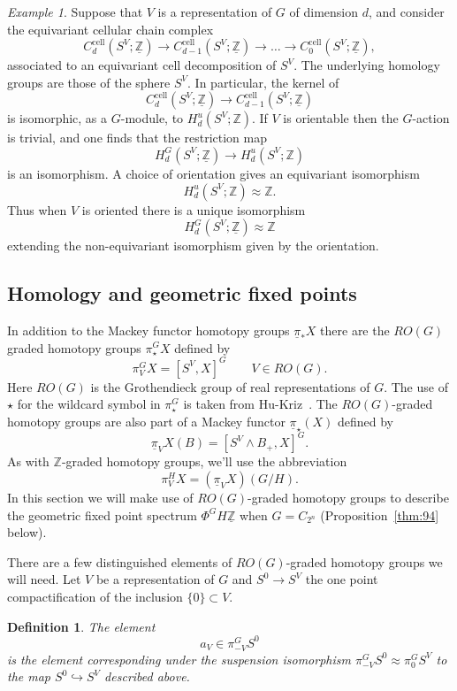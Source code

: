 \documentclass{amsart}
\newtheorem{definition}[equation]{Definition}
\newenvironment{defin}{\begin{definition}\rm}{\end{definition}}
\theoremstyle{definition}
\newtheorem{defin}[equation]{Definition}
\theoremstyle{remark}
\newtheorem{eg}[equation]{Example}
\newcommand{\Z}{{\mathbb Z}}
\newcommand{\pim}{\underline{\pi}}
\newcommand{\gfp}[1]{\Phi^{#1}}
\newcommand{\phig}{\gfp{G}}
\newcommand{\Zm}{\underline{\Z}}
\newcommand{\ztn}{C_{2^{n}}}
\begin{document}
\begin{eg}
\label{eg:5}
Suppose that $V$ is a representation of $G$ of dimension $d$, and
consider the equivariant cellular chain complex
\[
C_{d}^{\text{cell}}(S^{V};\Zm) \to C_{d-1}^{\text{cell}}(S^{V};\Zm)\to \dots
\to C_{0}^{\text{cell}}(S^{V};\Zm),
\]
associated to an equivariant cell decomposition of $S^{V}$.  The
underlying homology groups are those of the sphere $S^{V}$.  In
particular, the kernel of
\[
C_{d}^{\text{cell}}(S^{V};\Zm) \to C_{d-1}^{\text{cell}}(S^{V};\Zm)
\]
is isomorphic, as a $G$-module, to $H^{u}_{d}(S^{V};\Z)$.  If $V$ is
orientable then the $G$-action is trivial, and one finds that the
restriction map
\[
H_{d}^{G}(S^{V};\Zm)\to H_{d}^{u}(S^{V};\Z)
\]
is an isomorphism.  A choice of orientation gives an equivariant
isomorphism
\[
H^{u}_{d}(S^{V};\Z)\approx \Z.
\]
Thus when $V$ is oriented there is a unique isomorphism
\[
H_{d}^{G}(S^{V};\Zm)\approx \Z
\]
extending the non-equivariant isomorphism given by the orientation.
\end{eg}

\subsection{Homology and geometric fixed points}
\label{sec:homol-geom-fixed}

In addition to the Mackey functor
homotopy groups $\pim_{\ast}X$ there are the $RO(G)$ graded homotopy
groups $\pi^{G}_{\star}X$ defined by
\[
\pi^{G}_{V}X = [S^{V},X]^{G}\qquad V\in RO(G).
\]
Here $RO(G)$ is the Grothendieck group of real representations of $G$.
The use of $\star$ for the wildcard symbol in $\pi^{G}_{\star}$ is
taken from Hu-Kriz~\cite{MR1808224}.  The $RO(G)$-graded homotopy
groups are also part of a Mackey functor $\pim_{\star}(X)$ defined by
\[
\pim_{V}X(B) = [S^{V}\wedge B_{+},X]^{G}.
\]
As with $\Z$-graded homotopy groups, we'll use the abbreviation
\[
\pi^{H}_{V}X = (\pim_{V}X)(G/H).
\]
In this section we will make use of $RO(G)$-graded homotopy groups to
describe the geometric fixed point spectrum $\phig H\Zm$ when $G=\ztn$
(Proposition~\ref{thm:94} below).

There are a few distinguished elements of $RO(G)$-graded homotopy
groups we will need.  Let $V$ be a representation of $G$ and $S^{0}\to
S^{V}$ the one point compactification of the inclusion $\{0 \}\subset
V$.
\begin{defin}
\label{def:43}
The element 
\[
a_{V}\in \pi^{G}_{-V}S^{0}
\]
is the element corresponding under the suspension isomorphism
$\pi^{G}_{-V}S^{0}\approx \pi^{G}_{0}S^{V}$ to the map
$S^{0}\hookrightarrow S^{V}$ described above.
\end{defin}
\end{document}
